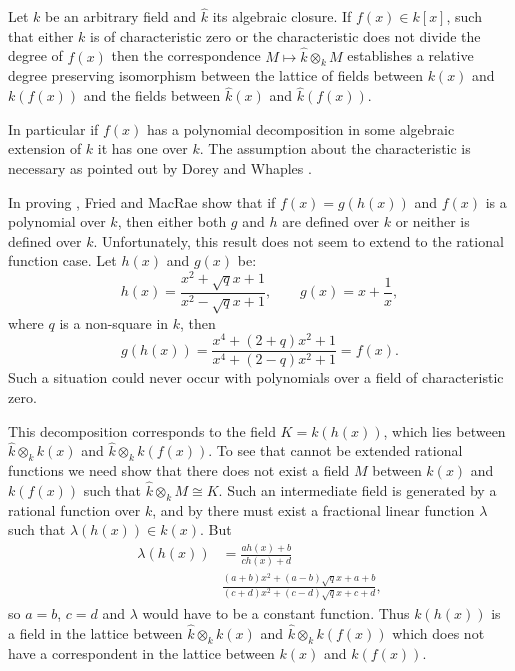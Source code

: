 \begin{proposition} \label{Base:Change:Prop}
Let $k$ be an arbitrary field and $\hat{k}$ its algebraic closure.  If
$f(x) \in k[x]$, such that either $k$ is of characteristic zero or the
characteristic does not divide the degree of $f(x)$ then the correspondence
$M \mapsto \hat{k}\otimes_k M$ establishes a relative degree preserving
isomorphism between the lattice of fields between $k(x)$ and $k(f(x))$ and
the fields between $\hat{k}(x)$ and $\hat{k}(f(x))$.
\end{proposition}

In particular if $f(x)$ has a polynomial decomposition in some
algebraic extension of $k$ it has one over $k$.  The assumption about
the characteristic is necessary as pointed out by Dorey and Whaples
\cite{Dorey1974-vp}.  

In proving , Fried and MacRae show that if
$f(x) = g(h(x))$ and $f(x)$ is a polynomial over $k$, then either both
$g$ and $h$ are defined over $k$ or neither is defined over $k$.
Unfortunately, this result does not seem to extend to the rational
function case.  Let $h(x)$ and $g(x)$ be:
\[
h(x) = \frac{x^2+\sqrt{q}x + 1}{x^2-\sqrt{q}x + 1}, \qquad
g(x) = x + \frac{1}{x},
\]
where $q$ is a non-square in $k$, then
\[
g(h(x)) = \frac{x^4 + (2 + q) x^2 + 1}{x^4 + (2 - q) x^2 + 1}
  = f(x).
\]
Such a situation could never occur with polynomials over a field of
characteristic zero.  

This decomposition corresponds to the field $K = k(h(x))$, which lies
between $\hat{k} \otimes_k k(x)$ and $\hat{k} \otimes_k k(f(x))$.  To
see that  cannot be extended rational
functions we need show that there does not exist a field $M$ between
$k(x)$ and $k(f(x))$ such that $\hat{k} \otimes_k M\cong K$.  Such an
intermediate field is generated by a rational function over $k$, and
by  there must exist a fractional
linear function $\lambda$ such that $\lambda(h(x)) \in k(x)$.  But
\[
\begin{aligned}
\lambda(h(x)) & = \frac{a h(x) + b}{c h(x) + d}\\
  & \frac{(a+b)x^2+(a-b)\sqrt{q}x+a+b}{(c+d)x^2+(c-d)\sqrt{q}x+c+d},
\end{aligned}
\]
so $a= b$, $c = d$ and $\lambda$ would have to be a constant function.
Thus $k(h(x))$ is a field in the lattice between $\hat{k}\otimes_k
k(x)$ and $\hat{k}\otimes_k k(f(x))$ which does not have a
correspondent in the lattice between $k(x)$ and $k(f(x))$.


